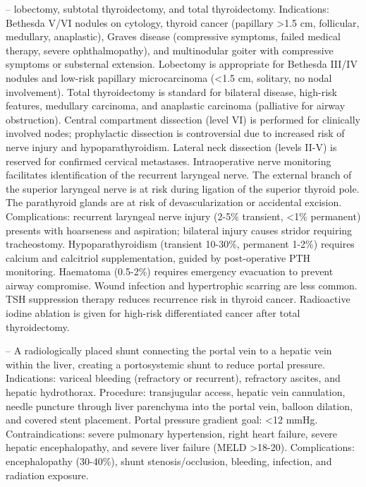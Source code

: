 -- lobectomy, subtotal thyroidectomy, and total thyroidectomy. Indications: Bethesda V/VI nodules on cytology, thyroid cancer (papillary >1.5 cm, follicular, medullary, anaplastic), Graves disease (compressive symptoms, failed medical therapy, severe ophthalmopathy), and multinodular goiter with compressive symptoms or substernal extension. Lobectomy is appropriate for Bethesda III/IV nodules and low-risk papillary microcarcinoma (<1.5 cm, solitary, no nodal involvement). Total thyroidectomy is standard for bilateral disease, high-risk features, medullary carcinoma, and anaplastic carcinoma (palliative for airway obstruction). Central compartment dissection (level VI) is performed for clinically involved nodes; prophylactic dissection is controversial due to increased risk of nerve injury and hypoparathyroidism. Lateral neck dissection (levels II-V) is reserved for confirmed cervical metastases. Intraoperative nerve monitoring facilitates identification of the recurrent laryngeal nerve. The external branch of the superior laryngeal nerve is at risk during ligation of the superior thyroid pole. The parathyroid glands are at risk of devascularization or accidental excision. Complications: recurrent laryngeal nerve injury (2-5\% transient, <1\% permanent) presents with hoarseness and aspiration; bilateral injury causes stridor requiring tracheostomy. Hypoparathyroidism (transient 10-30\%, permanent 1-2\%) requires calcium and calcitriol supplementation, guided by post-operative PTH monitoring. Haematoma (0.5-2\%) requires emergency evacuation to prevent airway compromise. Wound infection and hypertrophic scarring are less common. TSH suppression therapy reduces recurrence risk in thyroid cancer. Radioactive iodine ablation is given for high-risk differentiated cancer after total thyroidectomy.

-- A radiologically placed shunt connecting the portal vein to a hepatic vein within the liver, creating a portosystemic shunt to reduce portal pressure. Indications: variceal bleeding (refractory or recurrent), refractory ascites, and hepatic hydrothorax. Procedure: transjugular access, hepatic vein cannulation, needle puncture through liver parenchyma into the portal vein, balloon dilation, and covered stent placement. Portal pressure gradient goal: <12 mmHg. Contraindications: severe pulmonary hypertension, right heart failure, severe hepatic encephalopathy, and severe liver failure (MELD >18-20). Complications: encephalopathy (30-40\%), shunt stenosis/occlusion, bleeding, infection, and radiation exposure.

